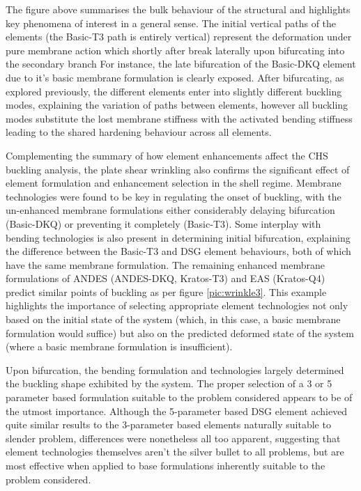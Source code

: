 The figure above summarises the bulk behaviour of the structural and highlights key phenomena of interest in a general sense. The initial vertical paths of the elements (the Basic-T3 path is entirely vertical) represent the deformation under pure membrane action which shortly after break laterally upon bifurcating into the secondary branch For instance, the late bifurcation of the Basic-DKQ element due to it's basic membrane formulation is clearly exposed. After bifurcating, as explored previously, the different elements enter into slightly different buckling modes, explaining the variation of paths between elements, however all buckling modes substitute the lost membrane stiffness with the activated bending stiffness leading to the shared hardening behaviour across all elements.

Complementing the summary of how element enhancements affect the CHS buckling analysis, the plate shear wrinkling also confirms the significant effect of element formulation and enhancement selection in the shell regime. Membrane technologies were found to be key in regulating the onset of buckling, with the un-enhanced membrane formulations either considerably delaying bifurcation (Basic-DKQ) or preventing it completely (Basic-T3). Some interplay with bending technologies is also present in determining initial bifurcation, explaining the difference between the Basic-T3 and DSG element behaviours, both of which have the same membrane formulation. The remaining enhanced membrane formulations of ANDES (ANDES-DKQ, Kratos-T3) and EAS (Kratos-Q4) predict similar points of buckling as per figure \ref{pic:wrinkle3}. This example highlights the importance of selecting appropriate element technologies not only based on the initial state of the system (which, in this case, a basic membrane formulation would suffice) but also on the predicted deformed state of the system (where a basic membrane formulation is insufficient).

 Upon bifurcation, the bending formulation and technologies largely determined the buckling shape exhibited by the system. The proper selection of a 3 or 5 parameter based formulation suitable to the problem considered appears to be of the utmost importance. Although the 5-parameter based DSG element achieved quite similar results to the 3-parameter based elements naturally suitable to slender problem, differences were nonetheless all too apparent, suggesting that element technologies themselves aren't the silver bullet to all problems, but are most effective when applied to base formulations inherently suitable to the problem considered.